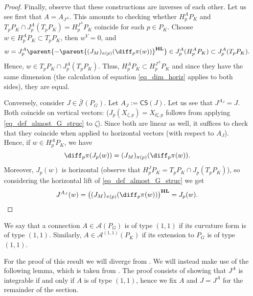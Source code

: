 \begin{proof}
    Finally, observe that these constructions are inverses of each other. Let us see first that \(A=A_{J^A}\). This amounts to checking whether \(H^A_p P_K\) and \(T_pP_K \cap J_p^A(T_pP_K)=H^{J^A}_pP_K\) coincide for each \(p \in P_K\). Choose \(w \in H^A_pP_K\subset T_pP_K\), then \(w^V=0\), and 
    \[
    w=J^A_p\parent{-\parent{(J_M)_{\pi(p)}(\diff_p\pi(w))}^{\mathbf{HL}}} \in J_p^A(H_p^AP_K)\subset J_p^A(T_pP_K).
    \]
    Hence, \(w \in T_pP_K \cap J_p^A(T_pP_K)\). Thus, \(H^A_p P_K \subset H^{J^A}_pP_K\) and since they have the same dimension (the calculation of equation \eqref{eq_dim_horiz} applies to both sides), they are equal. 

    Conversely, consider \(J \in \bar{\mathscr{J}}(P_G)\). Let \(A_J:=\mathsf{CS}(J)\). Let us see that \(J^{A_J}=J\). Both coincide on vertical vectors: (\(J_p(X_{\zeta,p})=X_{\ii \zeta,p}\) follows from applying \eqref{eq_def_almost_G_struc} to \(\zeta\)). Since both are linear as well, it suffices to check that they coincide when applied to horizontal vectors (with respect to \(A_J\)). Hence, if \(w \in H_p^AP_K\), we have 
    \begin{equation} \label{eq_prueba_CS_1}
    \diff_p\pi(J_p(w))=(J_M)_{\pi(p)}(\diff_p\pi(w)). 
    \end{equation}
    Moreover, \(J_p(w)\) is horizontal (observe that \(H^J_pP_K= T_pP_K\cap J_p(T_pP_K)\)), so considering the horizontal lift of \eqref{eq_def_almost_G_struc} we get
    \[
    J^{A_J}(w)=\big((J_{M})_{\pi(p)}(\diff_p \pi(w)) \big)^{\mathbf{HL}}=J_p(w).
    \]
\end{proof}

We say that a connection \(A\in \mathscr{A}(P_G)\) is of type \((1,1)\) if its curvature form is of type \((1,1)\). Similarly, \(A \in \mathscr{A}^{(1,1)}(P_K)\) if its extension to \(P_G\) is of type \((1,1)\).

For the proof of this result we will diverge from \parencite{Sandon_Chern_Correspondence}. We will instead make use of the following lemma, which is taken from \parencite{teleman_Newlander_Niremberg}. The proof consists of showing that \(J^A\) is integrable if and only if \(A\) is of type \((1,1)\), hence we fix \(A\) and \(J=J^A\) for the remainder of the section.

